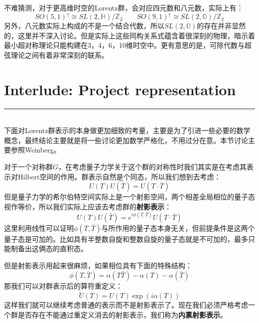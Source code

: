 不难猜测，对于更高维时空的Lorentz群，会对应四元数和八元数，实际上有：
\begin{equation}
	SO(5,1)^\uparrow\cong SL(2,\mathbb{H})/\mathbb{Z}_2\quad\quad
	SO(9,1)^\uparrow\cong SL(2,\mathbb{O})/\mathbb{Z}_2
\end{equation}
另外，八元数实际上构成的不是一个结合代数，所以$SL(2,\mathbb{O})$的存在并非显然的，这里并不深入讨论。但是实际上这些同构关系式蕴含着很深刻的物理，暗示着最小超对称理论只能构建在3，4，6，10维时空中。更有意思的是，可除代数与超弦理论之间有着非常深刻的联系。\cite{Baez1,Baez2}
\section*{Interlude: Project representation}
{\color{red}\hrule}
\hspace*{\fill} \\

下面对Lorentz群表示的本身做更加细致的考量，主要是为了引进一些必要的数学概念，最终结论主要就是将一些讨论更加数学严格化，不用过分在意。本节讨论主要参照Weinberg\cite{Weinberg}。

对于一个对称群$G$，在考虑量子力学关于这个群的对称性时我们其实是在考虑其表示对Hilbert空间的作用。群表示自然是个同态，所以我们想到去考虑：
\begin{equation}
	U(T)U(\bar T)=U(T\cdot \bar T)
\end{equation}
但是量子力学的希尔伯特空间实际上是一个射影空间，两个相差全局相位的量子态视作等价，所以我们实际上应该去考虑群的\textbf{射影表示}：
\begin{equation}
	U(T)U(\bar T)=e^{i\phi(T,\bar T)}U(T\cdot \bar T)	
\end{equation}
这里利用线性可以证明$\phi(T,\bar T)$与所作用的量子态本身无关，但前提条件是这两个量子态是可加的。比如具有半整数自旋和整数自旋的量子态就是不可加的，最多只能制备出这俩态的直积态。

但是射影表示用起来很麻烦，如果相位具有下面的特殊结构：
\[\phi(T,\bar T)=\alpha(T\bar T)-\alpha(T)-\alpha(\bar T)\]
那我们可以对群表示后的算符重定义：
\begin{equation}\label{redefine1}
	\tilde U(T)=U(T)\exp\left(i\alpha(T)\right)
\end{equation}
这样我们就可以继续考虑普通的表示而不是射影表示了。现在我们必须严格考虑一个群是否存在不能通过重定义消去的射影表示，我们称为\textbf{内禀射影表示}。

